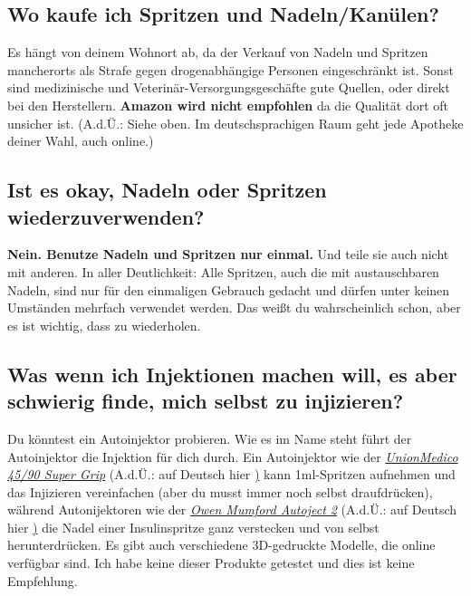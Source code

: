 \documentclass{article}
\begin{document}
\subsection{Wo kaufe ich Spritzen und Nadeln/Kanülen?}

Es hängt von deinem Wohnort ab, da der Verkauf von Nadeln und Spritzen mancherorts als Strafe gegen drogenabhängige Personen eingeschränkt ist. Sonst sind medizinische und Veterinär-Versorgungsgeschäfte gute Quellen, oder direkt bei den Herstellern. \textbf{Amazon wird nicht empfohlen} da die Qualität dort oft unsicher ist. (A.d.Ü.: Siehe oben. Im deutschsprachigen Raum geht jede Apotheke deiner Wahl, auch online.)

\subsection{Ist es okay, Nadeln oder Spritzen wiederzuverwenden?}

\textbf{Nein. Benutze Nadeln und Spritzen nur einmal. }Und teile sie auch nicht mit anderen. In aller Deutlichkeit: Alle Spritzen, auch die mit austauschbaren Nadeln, sind nur für den einmaligen Gebrauch gedacht und dürfen unter keinen Umständen mehrfach verwendet werden. Das weißt du wahrscheinlich schon, aber es ist wichtig, dass zu wiederholen.

\subsection{Was wenn ich Injektionen machen will, es aber schwierig finde, mich selbst zu injizieren?}\label{5-21}

Du könntest ein Autoinjektor probieren. Wie es im Name steht führt der Autoinjektor die Injektion für dich durch. Ein Autoinjektor wie der \href{https://unionmedico.com/90-super-grip/}{\textit{UnionMedico 45/90 Super Grip}} (A.d.Ü.: auf Deutsch hier \href{https://www.b12-injektion.de/}) kann 1ml-Spritzen aufnehmen und das Injizieren vereinfachen (aber du musst immer noch selbst draufdrücken), während Autonijektoren wie der \href{https://www.owenmumford.com/us/medical-devices/autoject-2}{\textit{Owen Mumford Autoject 2}} (A.d.Ü.: auf Deutsch hier \href{https://shop.owen-mumford.de/Sonstiges/Autoinjektor-Autoject-2-mit-austauschbarer-Nadel.html}) die Nadel einer Insulinspritze ganz verstecken und von selbst herunterdrücken. Es gibt auch verschiedene 3D-gedruckte Modelle, die online verfügbar sind. Ich habe keine dieser Produkte getestet und dies ist keine Empfehlung.
\end{document}
